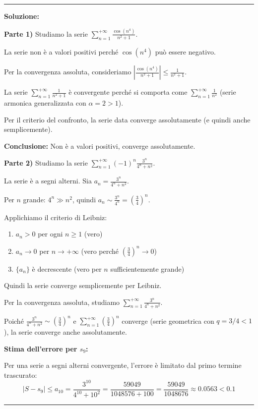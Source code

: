 \documentclass[12pt, a4paper]{article}
\newenvironment{solution}
{\par\noindent\rule{\textwidth}{0.4pt}\par\textbf{Soluzione:}\medskip\par}
{\par\rule{\textwidth}{0.4pt}\par\bigskip}
\begin{document}
\begin{solution}
\textbf{Parte 1)} Studiamo la serie $\displaystyle\sum_{n=1}^{+\infty} \frac{\cos(n^{4})}{n^{2}+1}$.

La serie non è a valori positivi perché $\cos(n^4)$ può essere negativo.

Per la convergenza assoluta, consideriamo $\left|\frac{\cos(n^{4})}{n^{2}+1}\right| \leq \frac{1}{n^{2}+1}$.

La serie $\displaystyle\sum_{n=1}^{+\infty} \frac{1}{n^{2}+1}$ è convergente perché si comporta come $\displaystyle\sum_{n=1}^{+\infty} \frac{1}{n^2}$ (serie armonica generalizzata con $\alpha = 2 > 1$).

Per il criterio del confronto, la serie data converge assolutamente (e quindi anche semplicemente).

\textbf{Conclusione:} Non è a valori positivi, converge assolutamente.

\vspace{0.5cm}

\textbf{Parte 2)} Studiamo la serie $\displaystyle\sum_{n=1}^{+\infty} (-1)^{n} \frac{3^{n}}{4^{n}+n^{2}}$.

La serie è a segni alterni. Sia $a_n = \frac{3^{n}}{4^{n}+n^{2}}$.

Per $n$ grande: $4^n \gg n^2$, quindi $a_n \sim \frac{3^{n}}{4^{n}} = \left(\frac{3}{4}\right)^n$.

Applichiamo il criterio di Leibniz:
\begin{enumerate}
    \item $a_n > 0$ per ogni $n \geq 1$ (vero)
    \item $a_n \to 0$ per $n \to +\infty$ (vero perché $\left(\frac{3}{4}\right)^n \to 0$)
    \item $\{a_n\}$ è decrescente (vero per $n$ sufficientemente grande)
\end{enumerate}

Quindi la serie converge semplicemente per Leibniz.

Per la convergenza assoluta, studiamo $\displaystyle\sum_{n=1}^{+\infty} \frac{3^{n}}{4^{n}+n^{2}}$.

Poiché $\frac{3^{n}}{4^{n}+n^{2}} \sim \left(\frac{3}{4}\right)^n$ e $\displaystyle\sum_{n=1}^{+\infty} \left(\frac{3}{4}\right)^n$ converge (serie geometrica con $q = 3/4 < 1$), la serie converge anche assolutamente.

\textbf{Stima dell'errore per $s_9$:}

Per una serie a segni alterni convergente, l'errore è limitato dal primo termine trascurato:
\[
|S - s_9| \leq a_{10} = \frac{3^{10}}{4^{10}+10^{2}} = \frac{59049}{1048576+100} = \frac{59049}{1048676} \approx 0.0563 < 0.1
\]


\end{solution}
\end{document}
